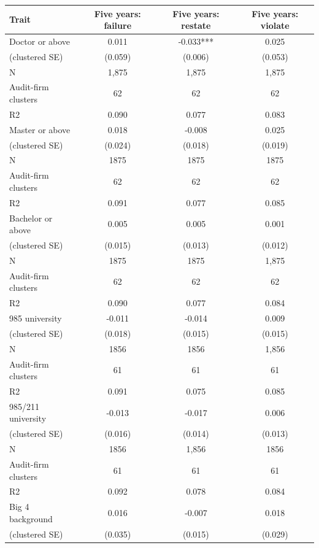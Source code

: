 \documentclass[10pt]{article}
\begin{document}
\begin{minipage}{19cm}\fontsize{10}{12}\selectfont\setlength{\tabcolsep}{4pt}\renewcommand{\arraystretch}{1.12}


\centering
{}
\begin{threeparttable}
\begin{tabular}{p{}ccc}
\toprule
Trait & Five years: failure & Five years: restate & Five years: violate \\
\midrule
Doctor or above & 0.011 & -0.033*** & 0.025 \\
(clustered SE) & (0.059) & (0.006) & (0.053) \\
N & 1,875 & 1,875 & 1,875 \\
Audit-firm clusters & 62 & 62 & 62 \\
R2 & 0.090 & 0.077 & 0.083 \\
Master or above & 0.018 & -0.008 & 0.025 \\
(clustered SE) & (0.024) & (0.018) & (0.019) \\
N & 1875 & 1875 & 1875 \\
Audit-firm clusters & 62 & 62 & 62 \\
R2 & 0.091 & 0.077 & 0.085 \\
Bachelor or above & 0.005 & 0.005 & 0.001 \\
(clustered SE) & (0.015) & (0.013) & (0.012) \\
N & 1875 & 1875 & 1,875 \\
Audit-firm clusters & 62 & 62 & 62 \\
R2 & 0.090 & 0.077 & 0.084 \\
985 university & -0.011 & -0.014 & 0.009 \\
(clustered SE) & (0.018) & (0.015) & (0.015) \\
N & 1856 & 1856 & 1,856 \\
Audit-firm clusters & 61 & 61 & 61 \\
R2 & 0.091 & 0.075 & 0.085 \\
985/211 university & -0.013 & -0.017 & 0.006 \\
(clustered SE) & (0.016) & (0.014) & (0.013) \\
N & 1856 & 1,856 & 1856 \\
Audit-firm clusters & 61 & 61 & 61 \\
R2 & 0.092 & 0.078 & 0.084 \\
Big 4 background & 0.016 & -0.007 & 0.018 \\
(clustered SE) & (0.035) & (0.015) & (0.029) \\

\end{tabular}
\end{threeparttable}
\end{minipage}
\end{document}
